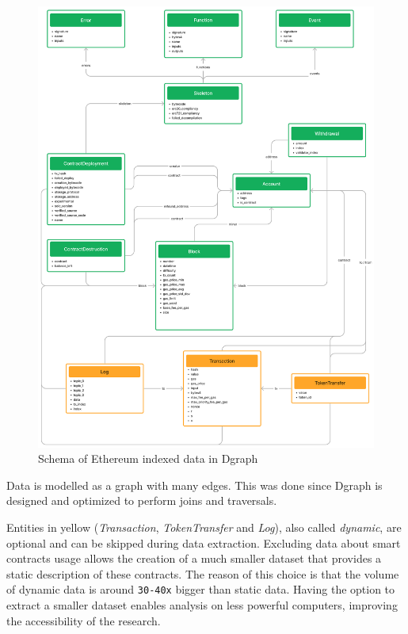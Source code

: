 
\begin{figure}[H]
  \centering
  \includegraphics[width=1\textwidth]{Figures/methods/schema.png}
  \caption[Schema of Ethereum indexed data in Dgraph]{Schema of Ethereum indexed data in Dgraph}
  \label{fig:schema}
\end{figure}

Data is modelled as a graph with many edges. This was done since Dgraph is designed and optimized to perform joins and traversals.

Entities in yellow (\textit{Transaction}, \textit{TokenTransfer} and \textit{Log}), also called \textit{dynamic}, are optional and can be skipped during data extraction. Excluding data about smart contracts usage allows the creation of a much smaller dataset that provides a static description of these contracts. The reason of this choice is that the volume of dynamic data is around {\tt 30-40x} bigger than static data. Having the option to extract a smaller dataset enables analysis on less powerful computers, improving the accessibility of the research. \\

